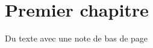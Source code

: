 \documentclass[12pt,oneside]{book}
\makeatletter
\let\SF@@footnote\footnote
\def\footnote{\ifx\protect\@typeset@protect
    \expandafter\SF@@footnote
  \else
    \expandafter\SF@gobble@opt
  \fi
}
\edef\SF@gobble@opt{\noexpand\protect
  \expandafter\noexpand\csname SF@gobble@opt \endcsname}
\makeatother
\begin{document}



\chapter{Premier chapitre}

Du texte\cite{drouet2012} \footnote{avec une note de bas de page}


\pagestyle{fancy}
\fancyhead[RO,LE]{\thepage}
\fancyhead[LO,RE]{}
\printbibliography
\end{document}
